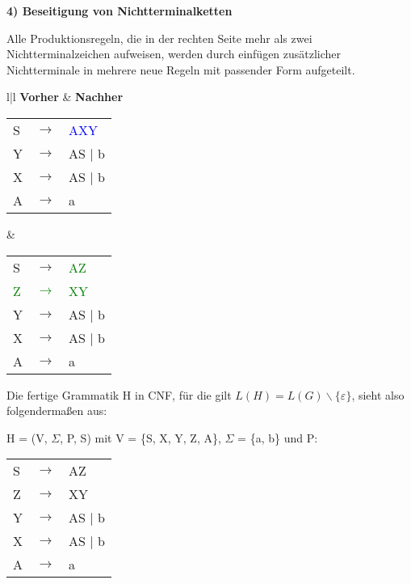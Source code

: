 	\newpage 
	\textbf{4) Beseitigung von Nichtterminalketten} 
		
	Alle Produktionsregeln, die in der rechten Seite mehr als zwei Nichtterminalzeichen aufweisen, werden durch einfügen zusätzlicher Nichtterminale in mehrere neue Regeln mit passender Form aufgeteilt.
	
	\begin{tabular}{l|l}
		\textbf{Vorher} & \textbf{Nachher} \\
		\hline
		\begin{tabular}{lcl}
			S  & $\rightarrow$ & \textcolor{blue}{AXY} \\
			Y  & $\rightarrow$ & AS $\mid$ b         \\
			X  & $\rightarrow$ & AS $\mid$ b         \\ 
			A  & $\rightarrow$ & a \\
		\end{tabular} &
		\begin{tabular}{lcl}
			S  & $\rightarrow$ & \textcolor{green}{AZ}  \\
			\textcolor{green}{Z}  & \textcolor{green}{$\rightarrow$} & \textcolor{green}{XY} \\
			Y  & $\rightarrow$ & AS $\mid$ b         \\
			X  & $\rightarrow$ & AS $\mid$ b         \\ 
			A  & $\rightarrow$ & a \\
		\end{tabular}
	\end{tabular}
	
	Die fertige Grammatik H in CNF, für die gilt $L(H)=L(G)\backslash \{\varepsilon \}$, sieht also folgendermaßen aus:
	
	H = (V, $\Sigma$, P, S) mit V = \{S, X, Y, Z, A\}, $\Sigma$ = \{a, b\} und P:
	
	\begin{tabular}{lcl}
		S  & $\rightarrow$ & AZ  \\
		Z  & $\rightarrow$ & XY \\
		Y  & $\rightarrow$ & AS $\mid$ b \\
		X  & $\rightarrow$ & AS $\mid$ b \\ 
		A  & $\rightarrow$ & a \\
	\end{tabular} \\

